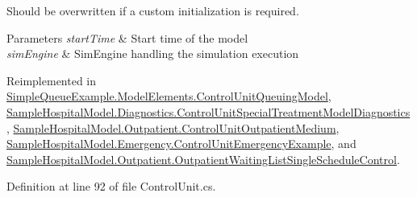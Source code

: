 Should be overwritten if a custom initialization is required. 


\begin{DoxyParams}{Parameters}
{\em start\+Time} & Start time of the model\\
\hline
{\em sim\+Engine} & Sim\+Engine handling the simulation execution\\
\hline
\end{DoxyParams}


Reimplemented in \hyperlink{class_simple_queue_example_1_1_model_elements_1_1_control_unit_queuing_model_a89bbdcb2df864ca97f6469a6d821119b}{Simple\+Queue\+Example.\+Model\+Elements.\+Control\+Unit\+Queuing\+Model}, \hyperlink{class_sample_hospital_model_1_1_diagnostics_1_1_control_unit_special_treatment_model_diagnostics_a7cc86268c66b811c20fbc13af3d22795}{Sample\+Hospital\+Model.\+Diagnostics.\+Control\+Unit\+Special\+Treatment\+Model\+Diagnostics}, \hyperlink{class_sample_hospital_model_1_1_outpatient_1_1_control_unit_outpatient_medium_a82f44f37914ead8e9db5ec5c49eb5149}{Sample\+Hospital\+Model.\+Outpatient.\+Control\+Unit\+Outpatient\+Medium}, \hyperlink{class_sample_hospital_model_1_1_emergency_1_1_control_unit_emergency_example_a13a754c15b8c7db6d1d074f2bf2c463f}{Sample\+Hospital\+Model.\+Emergency.\+Control\+Unit\+Emergency\+Example}, and \hyperlink{class_sample_hospital_model_1_1_outpatient_1_1_outpatient_waiting_list_single_schedule_control_a6a0e24f518e6c6137097894c16d85432}{Sample\+Hospital\+Model.\+Outpatient.\+Outpatient\+Waiting\+List\+Single\+Schedule\+Control}.



Definition at line 92 of file Control\+Unit.\+cs.

